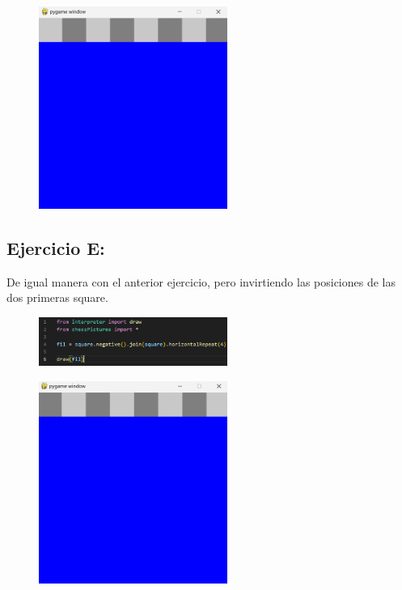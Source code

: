 \documentclass{article}
\begin{document}
	\begin{figure}[H]
		\centering
		\includegraphics[width=0.55\textwidth,keepaspectratio]{img/Picture D.png}
	\end{figure}	
	
	\subsection{Ejercicio E:}
	
	De igual manera con el anterior ejercicio, pero invirtiendo las posiciones de las dos primeras square.
	
	\begin{figure}[H]
		\centering
		\includegraphics[width=0.55\textwidth,keepaspectratio]{img/cap14.png}
	\end{figure}
	
	\begin{figure}[H]
		\centering
		\includegraphics[width=0.55\textwidth,keepaspectratio]{img/Picture E.png}
	\end{figure}	
	
\end{document}
